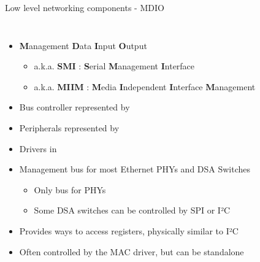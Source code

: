 \begin{frame}{Low level networking components - MDIO}
\begin{columns}
		\begin{itemize}
			\item \textbf{M}anagement \textbf{D}ata \textbf{I}nput \textbf{O}utput
				\begin{itemize}
					\item a.k.a. \textbf{SMI} : \textbf{S}erial \textbf{M}anagement \textbf{I}nterface
					\item a.k.a. \textbf{MIIM} : \textbf{M}edia \textbf{I}ndependent \textbf{I}nterface \textbf{M}anagement
				\end{itemize}
			\item Bus controller represented by 
			\item Peripherals represented by 
			\item Drivers in 
			\item Management bus for most Ethernet PHYs and DSA Switches
				\begin{itemize}
					\item Only bus for PHYs
					\item Some DSA switches can be controlled by SPI or I²C
				\end{itemize}
			\item Provides ways to access registers, physically similar to I²C
			\item Often controlled by the MAC driver, but can be standalone
		\end{itemize}
	\end{columns}
\end{frame}

